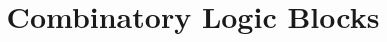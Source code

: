 \documentclass[11pt,a4paper]{article}
\begin{document}
\title{Combinatory Logic Blocks}
\date{}
\maketitle

\tableofcontents
\newpage




\end{document}
